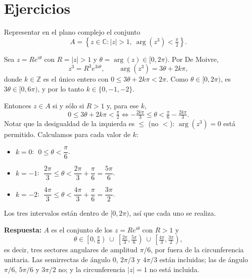 \section{Ejercicios}

\begin{ejemplo}
Representar en el plano complejo el conjunto
\[
A=\left\{z\in\mathbb{C} : |z|>1,\ \arg(z^3)<\tfrac{\pi}{2}\right\}.
\]

Sea $z=Re^{i\theta}$ con $R=|z|>1$ y $\theta=\arg(z)\in[0,2\pi)$. Por De Moivre,
\[
z^3=R^3e^{3i\theta}, \qquad \arg(z^3)=3\theta+2k\pi,
\]
donde $k\in\mathbb{Z}$ es el único entero con $0\le 3\theta+2k\pi<2\pi$. Como
$\theta\in[0,2\pi)$, es $3\theta\in[0,6\pi)$, y por lo tanto $k\in\{0,-1,-2\}$.

Entonces $z\in A$ si y sólo si $R>1$ y, para ese $k$,
\[
0\le 3\theta+2k\pi<\tfrac{\pi}{2}
\iff -\tfrac{2k\pi}{3}\le\theta<\tfrac{\pi}{6}-\tfrac{2k\pi}{3}.
\]
Notar que la desigualdad de la izquierda es $\le$ (no $<$): $\arg(z^3)=0$ está
permitido. Calculamos para cada valor de $k$:
\begin{itemize}
    \item $k=0$: $\;0\le\theta<\dfrac{\pi}{6}$.
    \item $k=-1$: $\;\dfrac{2\pi}{3}\le\theta<\dfrac{2\pi}{3}+\dfrac{\pi}{6}=\dfrac{5\pi}{6}$.
    \item $k=-2$: $\;\dfrac{4\pi}{3}\le\theta<\dfrac{4\pi}{3}+\dfrac{\pi}{6}=\dfrac{3\pi}{2}$.
\end{itemize}
Los tres intervalos están dentro de $[0,2\pi)$, así que cada uno se realiza.

\textbf{Respuesta:} $A$ es el conjunto de los $z=Re^{i\theta}$ con $R>1$ y
\[
\theta\in\left[0,\tfrac{\pi}{6}\right)\ \cup\ \left[\tfrac{2\pi}{3},\tfrac{5\pi}{6}\right)\ \cup\ \left[\tfrac{4\pi}{3},\tfrac{3\pi}{2}\right),
\]
es decir, tres sectores angulares de amplitud $\pi/6$, por fuera de la circunferencia
unitaria. Las semirrectas de ángulo $0$, $2\pi/3$ y $4\pi/3$ están incluidas; las de
ángulo $\pi/6$, $5\pi/6$ y $3\pi/2$ no; y la circunferencia $|z|=1$ no está incluida.

\begin{center}
\end{center}
\end{ejemplo}

